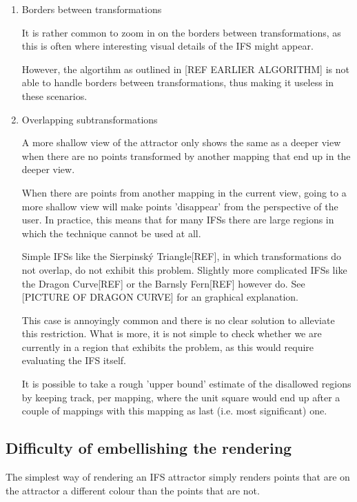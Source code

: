 \documentclass[11pt]{article}
\begin{document}
\begin{enumerate}
\item Borders between transformations
\label{sec:orge8567ee}

It is rather common to zoom in on the borders between transformations, as this is often
where interesting visual details of the IFS might appear.

However, the algortihm as outlined in [REF EARLIER ALGORITHM] is not able to handle borders between transformations,
thus making it useless in these scenarios.

\item Overlapping subtransformations
\label{sec:org7a68ea1}

A more shallow view of the attractor only shows the same as a deeper view when
there are no points transformed by another mapping that end up in the deeper view.

When there are points from another mapping in the current view, 
going to a more shallow view will make points 'disappear' from the perspective of the user.
In practice, this means that for many IFSs there are large regions in which the technique cannot be used at all.

Simple IFSs like the Sierpinský Triangle[REF], in which transformations
do not overlap, do not exhibit this problem. 
Slightly more complicated IFSs like the Dragon Curve[REF] or the Barnsly Fern[REF] however do.
See [PICTURE OF DRAGON CURVE] for an graphical explanation.

This case is annoyingly common and there is no clear solution to alleviate this restriction.
What is more, it is not simple to check whether we are currently in a region that exhibits the problem,
as this would require evaluating the IFS itself.

It is possible to take a rough 'upper bound' estimate of the disallowed regions by keeping track, 
per mapping, where the unit square would end up after a couple of mappings with this mapping as last (i.e. most significant) one.

\end{enumerate}

\subsection{Difficulty of embellishing the rendering}
\label{sec:org63c4e91}

The simplest way of rendering an IFS attractor simply renders points that are on the attractor a different colour
than the points that are not.
\end{document}
